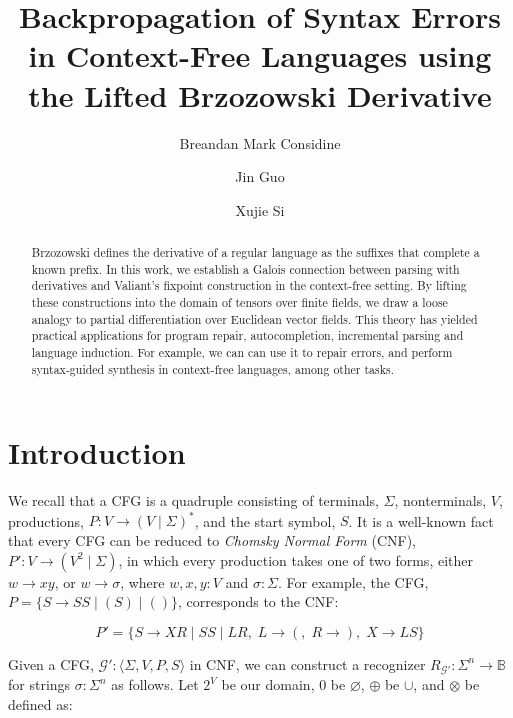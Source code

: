 \documentclass[sigplan,nonacm]{acmart}\settopmatter{printfolios=false,printccs=false,printacmref=false}
\begin{document}
  \title{Backpropagation of Syntax Errors in Context-Free Languages using the Lifted Brzozowski Derivative}
  \begin{abstract}
    Brzozowski defines the derivative of a regular language as the suffixes that complete a known prefix. In this work, we establish a Galois connection between parsing with derivatives and Valiant's fixpoint construction in the context-free setting. By lifting these constructions into the domain of tensors over finite fields, we draw a loose analogy to partial differentiation over Euclidean vector fields. This theory has yielded practical applications for program repair, autocompletion, incremental parsing and language induction. For example, we can can use it to repair errors, and perform syntax-guided synthesis in context-free languages, among other tasks.
  \end{abstract}

  \author{Breandan Mark Considine}

  \author{Jin Guo}

  \author{Xujie Si}

  \maketitle

  \section{Introduction}

  We recall that a CFG is a quadruple consisting of terminals, $\Sigma$, nonterminals, $V$, productions, $P: V \rightarrow (V \mid \Sigma)^*$, and the start symbol, $S$. It is a well-known fact that every CFG can be reduced to \textit{Chomsky Normal Form} (CNF), $P': V \rightarrow (V^2 \mid \Sigma)$, in which every production takes one of two forms, either $w \rightarrow xy$, or $w \rightarrow \sigma$, where $w, x, y: V$ and $\sigma: \Sigma$. For example, the CFG, $P=\{S \rightarrow S S \mid ( S ) \mid ()\}$, corresponds to the CNF:\vspace{-10pt}

  \[
    P'=\{S\rightarrow XR \mid SS \mid LR,\; L \rightarrow (,\; R \rightarrow ),\; X\rightarrow LS\}
  \]

  \noindent Given a CFG, $\mathcal{G}' : \langle \Sigma, V, P, S\rangle$ in CNF, we can construct a recognizer $R_{\mathcal{G}'}: \Sigma^n \rightarrow \mathbb{B}$ for strings $\sigma: \Sigma^n$ as follows. Let $2^V$ be our domain, $0$ be $\varnothing$, $\oplus$ be $\cup$, and $\otimes$ be defined as:\vspace{-10pt}
\end{document}
